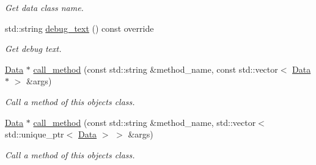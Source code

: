 \begin{DoxyCompactItemize}
\begin{DoxyCompactList}\small\item\em Get data class name. \end{DoxyCompactList}\item 
std\+::string \hyperlink{classcreek_1_1_object_a65f18a4791281093084bc8a92a82443b}{debug\+\_\+text} () const  override\hypertarget{classcreek_1_1_object_a65f18a4791281093084bc8a92a82443b}{}\label{classcreek_1_1_object_a65f18a4791281093084bc8a92a82443b}

\begin{DoxyCompactList}\small\item\em Get debug text. \end{DoxyCompactList}\item 
\hyperlink{classcreek_1_1_data}{Data} $\ast$ \hyperlink{classcreek_1_1_object_ac1efdf1012da51c7e84f06ddb910c50f}{call\+\_\+method} (const std\+::string \&method\+\_\+name, const std\+::vector$<$ \hyperlink{classcreek_1_1_data}{Data} $\ast$ $>$ \&args)
\begin{DoxyCompactList}\small\item\em Call a method of this object\textquotesingle{}s class. \end{DoxyCompactList}\item 
\hyperlink{classcreek_1_1_data}{Data} $\ast$ \hyperlink{classcreek_1_1_object_a6356f38acdea524d3f5c18cd0f80bc54}{call\+\_\+method} (const std\+::string \&method\+\_\+name, std\+::vector$<$ std\+::unique\+\_\+ptr$<$ \hyperlink{classcreek_1_1_data}{Data} $>$ $>$ \&args)
\begin{DoxyCompactList}\small\item\em Call a method of this object\textquotesingle{}s class. \end{DoxyCompactList}\end{DoxyCompactItemize}
